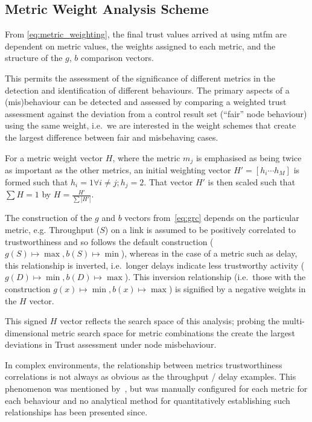 \subsection{Metric Weight Analysis Scheme}

From \autoref{eq:metric_weighting}, the final trust values arrived at using \gls{mtfm} are dependent on metric values, the weights assigned to each metric, and the structure of the $g$, $b$ comparison vectors.

This permits the assessment of the significance of different metrics in the detection and identification of different behaviours. 
The primary aspects of a (mis)behaviour can be detected and assessed by comparing a weighted trust assessment against the deviation from a control result set (``fair'' node behaviour) using the same weight, i.e.\ we are interested in the weight schemes that create the largest difference between fair and misbehaving cases.

For a metric weight vector $H$, where the metric $m_j$ is emphasised as being twice as important as the other metrics, an initial weighting vector $H'=[h_i\cdots h_M]$ is formed such that $h_i = 1 \forall i \ne j; h_j=2$. 
That vector $H'$ is then scaled such that $\sum H = 1$ by $H= \frac{H'}{\sum |H'|}$.

The construction of the $g$ and $b$ vectors from~\autoref{eq:grc} depends on the particular metric, e.g. Throughput ($S$) on a link is assumed to be positively correlated to trustworthiness and so follows the default construction ($g(S) \mapsto \max, b(S) \mapsto \min$), whereas in the case of a metric such as delay, this relationship is inverted, i.e.\ longer delays indicate less trustworthy activity ($g(D) \mapsto \min, b(D) \mapsto \max$).
This inversion relationship (i.e.\ those with the construction $g(x) \mapsto \min, b(x) \mapsto \max$) is signified by a negative weights in the $H$ vector.

This signed $H$ vector reflects the search space of this analysis; probing the multi-dimensional metric search space for metric combinations the create the largest deviations in Trust assessment under node misbehaviour.

In complex environments, the relationship between metrics trustworthiness correlations is not always as obvious as the throughput / delay examples.
This phenomenon was mentioned by~\citet{Guo2012}, but was manually configured for each metric for each behaviour and no analytical method for quantitatively establishing such relationships has been presented since.

